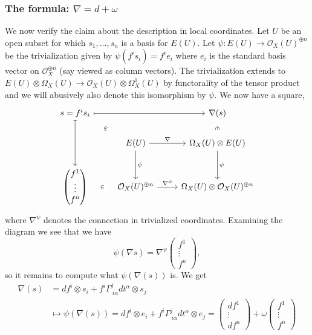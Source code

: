 \documentclass[12pt]{book}
\numberwithin{equation}{section}
\theoremstyle{definition}
\theoremstyle{remark}
\newcommand{\Ocal}{\mathcal{O}}
\begin{document}
\subsubsection{The formula: $\nabla = d +\omega$}
We now verify the claim about the description in local coordinates.
Let $U$ be an open subset for which $s_1,\ldots,s_n$ is a basis for $E(U)$. 
Let $\psi: E(U) \to \Ocal_X(U)^{\oplus n}$ be the trivialization given by $\psi(f^is_i) = f^ie_i$ where $e_i$ is the standard basis vector on $\Ocal_X^{\oplus n}$ (say viewed as column vectors).
The trivialization extends to $E(U) \otimes \Omega_X(U) \to \Ocal_X(U) \otimes \Omega_X^1(U)$ by functorality of the tensor product and we will abusively also denote this isomorphism by $\psi$. 
We now have a square,
$$\begin{tikzcd}[contains/.style = {draw=none,"\in" description,sloped}]
s=f^is_i \arrow[dd,mapsto] \arrow[dr, contains] \arrow[rr,mapsto]& & \nabla(s) \arrow[d,contains] \\ 
& E(U) \arrow[r, "\nabla"] \arrow[d,above,"\psi"]& \Omega_X(U) \otimes E(U)  \arrow[d, "\psi"]\\
\begin{pmatrix}
f^1 \\
\vdots \\
f^n 
\end{pmatrix}\arrow[r,contains]& \Ocal_X(U)^{\oplus n} \arrow[r, "\nabla^{\psi}"] & \Omega_X(U) \otimes \Ocal_X(U)^{\oplus n}
\end{tikzcd}$$
where $\nabla^{\psi}$ denotes the connection in trivialized coordinates. 
Examining the diagram we see that we have 
$$ \psi(\nabla s) = \nabla^{\psi} \begin{pmatrix}
f^1 \\
\vdots \\
f^n 
\end{pmatrix},$$
so it remains to compute what $\psi(\nabla(s))$ is.
We get 
\begin{align*}
\nabla(s) &= df^i\otimes s_i + f^i \Gamma^j_{\ i \alpha} dt^{\alpha} \otimes s_j \\
&\mapsto \psi(\nabla(s))  =df^i \otimes e_i + f^i \Gamma^j_{\ i \alpha} dt^{\alpha} \otimes e_j = \begin{pmatrix}
df^1 \\
\vdots \\
df^n
\end{pmatrix} + \omega \begin{pmatrix}
f^1 \\
\vdots \\
f^n
\end{pmatrix}
\end{align*}
\end{document}
